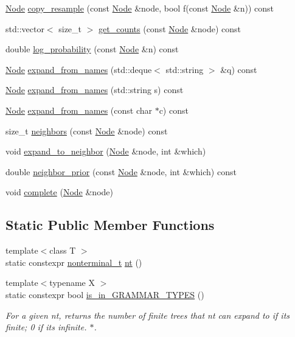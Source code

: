\begin{DoxyCompactItemize}
\item 
\hyperlink{class_node}{Node} \hyperlink{class_grammar_a9ce6fefd39e27641085efc3ad6a3b077}{copy\+\_\+resample} (const \hyperlink{class_node}{Node} \&node, bool f(const \hyperlink{class_node}{Node} \&n)) const
\item 
std\+::vector$<$ size\+\_\+t $>$ \hyperlink{class_grammar_a354a5d9bdaced96748c599bc7c3bd64a}{get\+\_\+counts} (const \hyperlink{class_node}{Node} \&node) const
\item 
double \hyperlink{class_grammar_a44385654719beb219184074602ee7440}{log\+\_\+probability} (const \hyperlink{class_node}{Node} \&n) const
\item 
\hyperlink{class_node}{Node} \hyperlink{class_grammar_acd13159e6ec71f73b5398ba5a56ac109}{expand\+\_\+from\+\_\+names} (std\+::deque$<$ std\+::string $>$ \&q) const
\item 
\hyperlink{class_node}{Node} \hyperlink{class_grammar_a5ce6aa2e9804ddf12cc98a385ef2f633}{expand\+\_\+from\+\_\+names} (std\+::string s) const
\item 
\hyperlink{class_node}{Node} \hyperlink{class_grammar_ae77fa63427506125ba51374826ce3800}{expand\+\_\+from\+\_\+names} (const char $\ast$c) const
\item 
size\+\_\+t \hyperlink{class_grammar_a7026d07264c64f85f370b01b19622415}{neighbors} (const \hyperlink{class_node}{Node} \&node) const
\item 
void \hyperlink{class_grammar_a5849e85e2c5b34174f82f9c784c92fe2}{expand\+\_\+to\+\_\+neighbor} (\hyperlink{class_node}{Node} \&node, int \&which)
\item 
double \hyperlink{class_grammar_a195bd7a052b34884c2e006cbd6ed3c94}{neighbor\+\_\+prior} (const \hyperlink{class_node}{Node} \&node, int \&which) const
\item 
void \hyperlink{class_grammar_a1524560f792f87da632c21f665666d21}{complete} (\hyperlink{class_node}{Node} \&node)
\end{DoxyCompactItemize}
\subsection*{Static Public Member Functions}
\begin{DoxyCompactItemize}
\item 
{\footnotesize template$<$class T $>$ }\\static constexpr \hyperlink{_nonterminal_8h_a1c5bfe9b903f69c83bbde5da7035fef3}{nonterminal\+\_\+t} \hyperlink{class_grammar_ac7ec043aec5203a2cfac44f9cec50132}{nt} ()
\item 
{\footnotesize template$<$typename X $>$ }\\static constexpr bool \hyperlink{class_grammar_a09dff6ea6759e21aced0f655b496a93a}{is\+\_\+in\+\_\+\+G\+R\+A\+M\+M\+A\+R\+\_\+\+T\+Y\+P\+ES} ()
\begin{DoxyCompactList}\small\item\em For a given nt, returns the number of finite trees that nt can expand to if its finite; 0 if its infinite. $\ast$. \end{DoxyCompactList}\end{DoxyCompactItemize}
